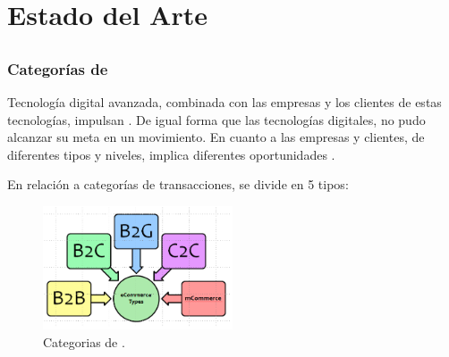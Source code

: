 \chapter{Estado del Arte}\label{cap:estadoArte}



%
%

\section{\ecommerce}

\subsection{Categorías de \ecommerce}

Tecnología digital avanzada, combinada con las empresas y los clientes de estas tecnologías, impulsan \ecommerce. De igual forma que las tecnologías digitales, \ecommerce no pudo alcanzar su meta en un movimiento. En cuanto a las empresas y clientes, \ecommerce de diferentes tipos y niveles, implica diferentes oportunidades \cite{zheng2009fundamentals}.

En relación a categorías de transacciones, \ecommerce se divide en 5 tipos:
\begin{figure}[h!]
	\centering
	\includegraphics[width=0.5\textwidth]{figuras/ecommerce_types.png}
	\caption{Categorias de \ecommerce.}
\end{figure}

